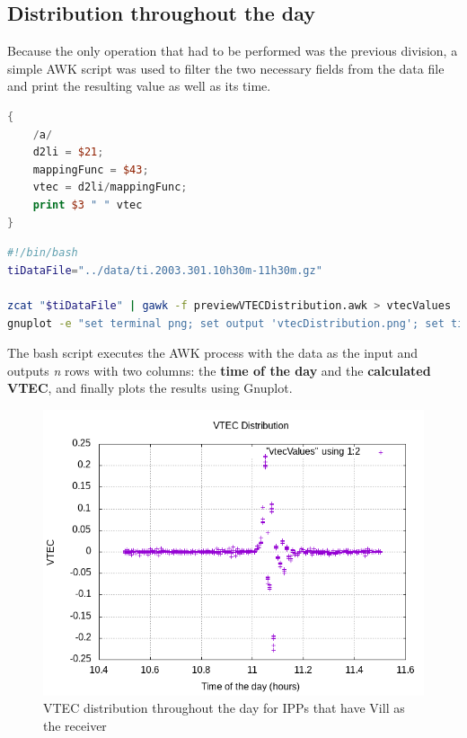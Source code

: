 \subsection{Distribution throughout the day}

Because the only operation that had to be performed was the previous division, a simple AWK script was used to filter the two necessary fields from the data file and print the resulting value as well as its time. 

\begin{minipage}{\linewidth}
\begin{lstlisting}[language=Awk, caption=AWK script to estimate the VTEC]
{
	/a/
	d2li = $21;
	mappingFunc = $43;
	vtec = d2li/mappingFunc;
	print $3 " " vtec
}
\end{lstlisting}
\end{minipage}

\begin{minipage}{\linewidth}
\begin{lstlisting}[language=Bash, caption=Bash script to execute the procedures]
#!/bin/bash
tiDataFile="../data/ti.2003.301.10h30m-11h30m.gz"

zcat "$tiDataFile" | gawk -f previewVTECDistribution.awk > vtecValues
gnuplot -e "set terminal png; set output 'vtecDistribution.png'; set title 'VTEC Distribution'; set xlabel 'Time of the day (hours)'; set ylabel 'VTEC'; set grid; plot \"vtecValues\" using 1:2 with point"
\end{lstlisting}
\end{minipage}


The bash script executes the AWK process with the data as the input and outputs \textit{n} rows with two columns: the \textbf{time of the day} and the \textbf{calculated VTEC}, and finally plots the results using Gnuplot. 

\begin{figure}[!htb]
	\begin{centering}
		\includegraphics[width=0.5\linewidth]{images/ch4/vtecDistributionVill.png}
		\caption{VTEC distribution throughout the day for IPPs that have Vill as the receiver}
		\label{fig:vtecDistribution}
	\end{centering}
\end{figure}


